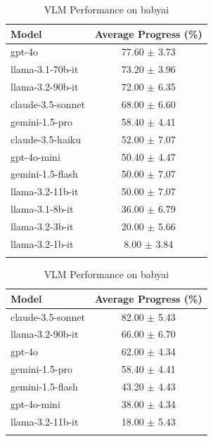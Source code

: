 \begin{table}[h]
    \centering
    \begin{minipage}[t]{0.48\linewidth}
    \centering
    \caption{LLM Performance on babyai}
    \begin{tabular}{lc}
    \hline
    Model & Average Progress (\%) \\
    \hline
    gpt-4o & 77.60 $\pm$ 3.73 \\
    llama-3.1-70b-it & 73.20 $\pm$ 3.96 \\
    llama-3.2-90b-it & 72.00 $\pm$ 6.35 \\
    claude-3.5-sonnet & 68.00 $\pm$ 6.60 \\
    gemini-1.5-pro & 58.40 $\pm$ 4.41 \\
    claude-3.5-haiku & 52.00 $\pm$ 7.07 \\
    gpt-4o-mini & 50.40 $\pm$ 4.47 \\
    gemini-1.5-flash & 50.00 $\pm$ 7.07 \\
    llama-3.2-11b-it & 50.00 $\pm$ 7.07 \\
    llama-3.1-8b-it & 36.00 $\pm$ 6.79 \\
    llama-3.2-3b-it & 20.00 $\pm$ 5.66 \\
    llama-3.2-1b-it & 8.00 $\pm$ 3.84 \\
    \hline
    \label{babyai_LLM}
    \end{tabular}
    \end{minipage}
    \hfill
    \begin{minipage}[t]{0.48\linewidth}
    \centering
    \caption{VLM Performance on babyai}
    \begin{tabular}{lc}
    \hline
    Model & Average Progress (\%) \\
    \hline
    claude-3.5-sonnet & 82.00 $\pm$ 5.43 \\
    llama-3.2-90b-it & 66.00 $\pm$ 6.70 \\
    gpt-4o & 62.00 $\pm$ 4.34 \\
    gemini-1.5-pro & 58.40 $\pm$ 4.41 \\
    gemini-1.5-flash & 43.20 $\pm$ 4.43 \\
    gpt-4o-mini & 38.00 $\pm$ 4.34 \\
    llama-3.2-11b-it & 18.00 $\pm$ 5.43 \\
    \hline
    \label{babyai_VLM}
    \end{tabular}
    \end{minipage}
\end{table}


